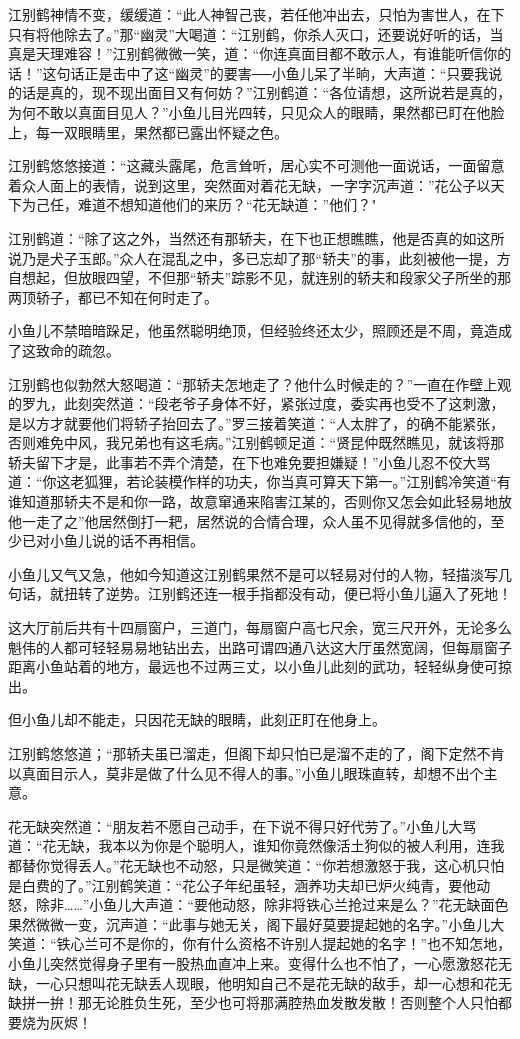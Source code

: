 \documentclass[12pt,oneside]{book}
\begin{document}
江别鹤神情不变，缓缓道：``此人神智己丧，若任他冲出去，只怕为害世人，在下只有将他除去了。''那``幽灵''大喝道：``江别鹤，你杀人灭口，还要说好听的话，当真是天理难容！''江别鹤微微一笑，道：``你连真面目都不敢示人，有谁能听信你的话！''这句话正是击中了这``幽灵''的要害──小鱼儿呆了半晌，大声道：``只要我说的话是真的，现不现出面目又有何妨？''江别鹤道：``各位请想，这所说若是真的，为何不敢以真面目见人？''小鱼儿目光四转，只见众人的眼睛，果然都已盯在他脸上，每一双眼睛里，果然都已露出怀疑之色。

江别鹤悠悠接道：``这藏头露尾，危言耸听，居心实不可测他一面说话，一面留意着众人面上的表情，说到这里，突然面对着花无缺，一字字沉声道：''花公子以天下为己任，难道不想知道他们的来历？``花无缺道：''他们？"

江别鹤道：``除了这之外，当然还有那轿夫，在下也正想瞧瞧，他是否真的如这所说乃是犬子玉郎。''众人在混乱之中，多已忘却了那``轿夫''的事，此刻被他一提，方自想起，但放眼四望，不但那``轿夫''踪影不见，就连别的轿夫和段家父子所坐的那两顶轿子，都已不知在何时走了。

小鱼儿不禁暗暗跺足，他虽然聪明绝顶，但经验终还太少，照顾还是不周，竟造成了这致命的疏忽。

江别鹤也似勃然大怒喝道：``那轿夫怎地走了？他什么时候走的？''一直在作壁上观的罗九，此刻突然道：``段老爷子身体不好，紧张过度，委实再也受不了这刺激，是以方才就要他们将轿子抬回去了。''罗三接着笑道：``人太胖了，的确不能紧张，否则难免中风，我兄弟也有这毛病。''江别鹤顿足道：``贤昆仲既然瞧见，就该将那轿夫留下才是，此事若不弄个清楚，在下也难免要担嫌疑！''小鱼儿忍不佼大骂道：``你这老狐狸，若论装模作样的功夫，你当真可算天下第一。''江别鹤冷笑道``有谁知道那轿夫不是和你一路，故意窜通来陷害江某的，否则你又怎会如此轻易地放他一走了之''他居然倒打一耙，居然说的合情合理，众人虽不见得就多信他的，至少已对小鱼儿说的话不再相信。

小鱼儿又气又急，他如今知道这江别鹤果然不是可以轻易对付的人物，轻描淡写几句话，就扭转了逆势。江别鹤还连一根手指都没有动，便已将小鱼儿逼入了死地！

这大厅前后共有十四扇窗户，三道门，每扇窗户高七尺余，宽三尺开外，无论多么魁伟的人都可轻轻易易地钻出去，出路可谓四通八达这大厅虽然宽阔，但每扇窗子距离小鱼站着的地方，最远也不过两三丈，以小鱼儿此刻的武功，轻轻纵身使可掠出。

但小鱼儿却不能走，只因花无缺的眼睛，此刻正盯在他身上。

江别鹤悠悠道；``那轿夫虽已溜走，但阁下却只怕已是溜不走的了，阁下定然不肯以真面目示人，莫非是做了什么见不得人的事。''小鱼儿眼珠直转，却想不出个主意。

花无缺突然道：``朋友若不愿自己动手，在下说不得只好代劳了。''小鱼儿大骂道：``花无缺，我本以为你是个聪明人，谁知你竟然像活土狗似的被人利用，连我都替你觉得丢人。''花无缺也不动怒，只是微笑道：``你若想激怒于我，这心机只怕是白费的了。''江别鹤笑道：``花公子年纪虽轻，涵养功夫却已炉火纯青，要他动怒，除非\ldots\ldots{}''小鱼儿大声道：``要他动怒，除非将铁心兰抢过来是么？''花无缺面色果然微微一变，沉声道：``此事与她无关，阁下最好莫要提起她的名字。''小鱼儿大笑道：``铁心兰可不是你的，你有什么资格不许别人提起她的名字！''也不知怎地，小鱼儿突然觉得身子里有一股热血直冲上来。变得什么也不怕了，一心愿激怒花无缺，一心只想叫花无缺丢人现眼，他明知自己不是花无缺的敌手，却一心想和花无缺拼一拚！那无论胜负生死，至少也可将那满腔热血发散发散！否则整个人只怕都要烧为灰烬！
\end{document}
